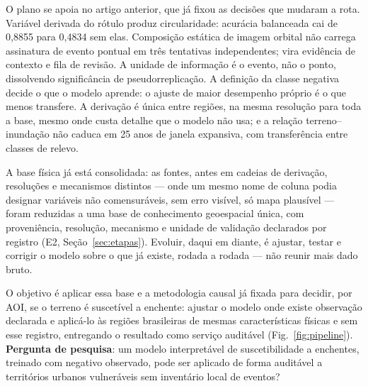 \documentclass[conference]{IEEEtran}
\begin{document}
O plano se apoia no artigo anterior, que já fixou as decisões que mudaram a
rota. Variável derivada do rótulo produz circularidade: acurácia balanceada
cai de 0,8855 para 0,4834 sem elas. Composição estática de imagem orbital não
carrega assinatura de evento pontual em três tentativas independentes; vira
evidência de contexto e fila de revisão. A unidade de informação é o evento,
não o ponto, dissolvendo significância de pseudorreplicação. A definição da
classe negativa decide o que o modelo aprende: o ajuste de maior desempenho
próprio é o que menos transfere. A derivação é única entre regiões, na mesma
resolução para toda a base, mesmo onde custa detalhe que o modelo não usa; e a
relação terreno--inundação não caduca em 25 anos de janela expansiva, com
transferência entre classes de relevo.

A base física já está consolidada: as fontes, antes em cadeias de derivação,
resoluções e mecanismos distintos --- onde um mesmo nome de coluna podia
designar variáveis não comensuráveis, sem erro visível, só mapa plausível ---
foram reduzidas a uma base de conhecimento geoespacial única, com
proveniência, resolução, mecanismo e unidade de validação declarados por
registro (E2, Seção~\ref{sec:etapas}). Evoluir, daqui em diante, é ajustar,
testar e corrigir o modelo sobre o que já existe, rodada a rodada --- não
reunir mais dado bruto.

O objetivo é aplicar essa base e a metodologia causal já fixada para decidir,
por AOI, se o terreno é suscetível a enchente: ajustar o modelo onde existe
observação declarada e aplicá-lo às regiões brasileiras de mesmas
características físicas e sem esse registro, entregando o resultado como serviço
auditável (Fig.~\ref{fig:pipeline}).
\textbf{Pergunta de pesquisa}: um modelo interpretável de suscetibilidade a
enchentes, treinado com negativo observado, pode ser aplicado de forma auditável
a territórios urbanos vulneráveis sem inventário local de eventos?
\end{document}
